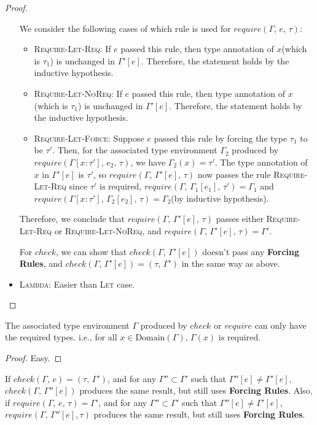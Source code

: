\documentclass[peerreview, 10pt]{IEEEtran}
\newcommand{\checktype}[4]{\ensuremath{{check}(#1,\,#2)=(#3,\,#4)}}
\newcommand{\requiretype}[4]{\ensuremath{{require}(#1,\,#2,\,#3)=#4}}
\newcommand{\required}[1]{\ensuremath{#1\text{ is required}}}
\newcommand{\domain}[1]{\ensuremath{\text{Domain}(#1)}}
\begin{document}
\begin{proof}
\begin{itemize}
        We consider the following cases of which rule is used for $require(\Gamma,\,e,\,\tau)$:
        \begin{itemize}
            \item \textsc{Require-Let-Req}: If $e$ passed this rule, then type annotation of $x$(which is $\tau_1$) is unchanged in $\Gamma'[e]$. Therefore, the statement holds by the inductive hypothesis.
            \item \textsc{Require-Let-NoReq}: If $e$ passed this rule, then type annotation of $x$(which is $\tau_1$) is unchanged in $\Gamma'[e]$. Therefore, the statement holds by the inductive hypothesis.
            \item \textsc{Require-Let-Force}: Suppose $e$ passed this rule by forcing the type $\tau_1$ to be $\tau'$. Then, for the associated type environment $\Gamma_2$ produced by $require(\Gamma[x:\tau'],\,e_2,\,\tau)$, we have $\Gamma_2(x)=\tau'$. The type annotation of $x$ in $\Gamma'[e]$ is $\tau'$, so $require(\Gamma,\,\Gamma'[e],\,\tau)$ now passes the rule \textsc{Require-Let-Req} since $\required{\tau'}$, \requiretype{\Gamma}{\Gamma_1[e_1]}{\tau'}{\Gamma_1} and \requiretype{\Gamma[x:\tau']}{\Gamma_2[e_2]}{\tau}{\Gamma_2}(by inductive hypothesis).
        \end{itemize}

        Therefore, we conclude that $require(\Gamma,\,\Gamma'[e],\,\tau)$ passes either \textsc{Require-Let-Req} or \textsc{Require-Let-NoReq}, and $\requiretype{\Gamma}{\Gamma'[e]}{\tau}{\Gamma'}$.

        For $check$, we can show that $check(\Gamma,\,\Gamma'[e])$ doesn't pass any \textbf{Forcing Rules}, and $\checktype{\Gamma}{\Gamma'[e]}{\tau}{\Gamma'}$ in the same way as above.
        \item \textsc{Lambda}: Easier than \textsc{Let} case.
    \end{itemize}
\end{proof}

\begin{lemma}
    \label{lem:required}
    The associated type environment $\Gamma$ produced by $check$ or $require$ can only have the required types. i.e., for all $x\in\domain{\Gamma}$, $\required{\Gamma(x)}$.
\end{lemma}

\begin{proof}
    Easy.
\end{proof}

\begin{theorem}
    \label{thm:check-apply-force}
    If $\checktype{\Gamma}{e}{\tau}{\Gamma'}$, and for any $\Gamma''\subset\Gamma'$ such that $\Gamma''[e]\neq\Gamma'[e]$, $check(\Gamma,\,\Gamma''[e])$ produces the same result, but still uses \textbf{Forcing Rules}. Also, if $\requiretype{\Gamma}{e}{\tau}{\Gamma'}$, and for any $\Gamma''\subset\Gamma'$ such that $\Gamma''[e]\neq\Gamma'[e]$, $require(\Gamma,\,\Gamma''[e], \tau)$ produces the same result, but still uses \textbf{Forcing Rules}.
\end{theorem}
\end{document}
